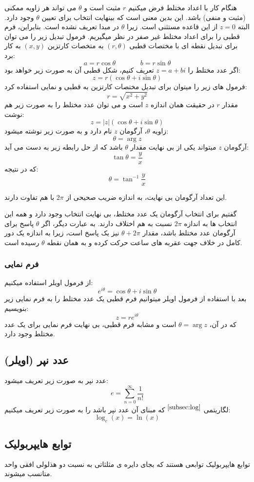 \documentclass[12pt, a4paper, oneside]{article}
\begin{document}
هنگام کار با اعداد مختلط فرض میکنیم $r$ مثبت است و $\theta$ می تواند هر زاویه ممکنی (مثبت و منفی) باشد. این بدین معنی است که بینهایت انتخاب برای تعیین $\theta$ وجود دارد. البته $z = 0$ از این قاعده مستثنی است. زیرا $\theta$ در مبدا تعریف نشده است. بنابراین، فرم قطبی را برای اعداد مختلط غیر صفر در نظر میگیریم.
فرمول تبدیل زیر را می توان برای تبدیل نقطه ای با مختصات قطبی $(r,\theta)$ به متخصات کارتزین $(x,y)$ به کار برد:
\[a=r\cos\theta\;\;\;\;\;\;\;\;\;\;\;\;\;b=r\sin\theta\]
اگر عدد مختلط را $z=a+bi$ تعریف کنیم، شکل قطبی آن به صورت زیر خواهد بود:
\[z=r(\cos\theta + i\sin\theta)\]
فرمول های زیر را میتوان برای تبدیل مختصات کارتزین به قطبی و نمایی استفاده کرد:
\[r=\sqrt{x^2+y^2}\]
مقدار $r$ در حقیقت همان اندازه $z$ است و می توان عدد مختلط را به صورت زیر هم نوشت:
\[z=|z|(\cos\theta+i\sin\theta)\]
زاویه $\theta$، آرگومان $z$ نام دارد و به صورت زیر نوشته میشود:
\[\theta=\arg z\]
آرگومان $z$ میتواند یکی از بی نهایت مقدار $\theta$ باشد که از حل رابطه زیر به دست می آید:
\[\tan\theta=\frac{y}{x}\]
که در نتیجه:
\[\theta=\tan^{-1}\frac{y}{x}\]

این تعداد آرگومان بی نهایت، به اندازه ضریب صحیحی از $2\pi$ با هم تفاوت دارند.

گفتیم برای انتخاب آرگومان یک عدد مختلط، بی نهایت انتخاب وجود دارد و همه این انتخاب ها به اندازه $2\pi$ نسبت به هم اختلاف دارند.
به عبارت دیگر، اگر $\theta$ پاسخ برای آرگومان عدد مختلط باشد، مقدار $\theta+2\pi$ نیز یک پاسخ است، زیرا به اندازه یک دور کامل در خلاف جهت عقربه های ساعت حرکت کرده و به همان نقطه $\theta$ رسیده است.
\subsubsection{فرم نمایی}
از فرمول اویلر استفاده میکنیم:
\[e^{i\theta} =\cos{\theta}+i\sin{\theta}\]
بعد با استفاده از فرمول اویلر میتوانیم فرم قطبی یک عدد مختلط را به فرم نمایی زیر بنویسیم:
\[z=re^{i\theta}\]
که در آن، $\theta=\arg{z}$ است و مشابه فرم قطبی، بی نهایت فرم نمایی برای یک عدد مختلط وجود دارد.
\subsection{عدد نپر (اویلر)}
عدد نپر به صورت زیر تعریف میشود:
\[e=\sum_{n=0}^{\infty} \frac{1}{n!}\]
لگاریتمی
{$\overset{\ref{subsec:log}}{}$}
 که مبنای آن عدد نپر باشد را به صورت زیر تعریف میکنیم: 
\[\log_e (x) = \ln (x)\]
\subsection{توابع هایپربولیک}
توابع هایپربولیک توابعی هستند که بجای دایره ی مثلثاتی به نسبت دو هذلولی افقی واحد متانسب میشوند.
 
\end{document}
